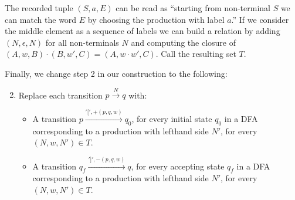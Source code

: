 \documentclass[runningheads]{llncs}
\newcommand{\pospl}{[}
\newcommand{\pospr}{]}
\begin{document}
The recorded tuple $(S, a, E)$ can be read as ``starting from non-terminal $S$ we can match the word $E$ by choosing the production with label $a$.'' If we consider the middle element as a sequence of labels we can build a relation by adding $(N, \epsilon, N)$ for all non-terminals $N$ and computing the closure of $(A, w, B) \cdot (B, w', C) = (A, w \cdot w', C)$. Call the resulting set $T$.

Finally, we change step 2 in our construction to the following:

\begin{enumerate}
  \setcounter{enumi}{1}
\item Replace each transition $p \xrightarrow{N} q$ with:
  \begin{itemize}
  \item A transition $p \xrightarrow{'\pospl', +(p,q,w)} q_0$, for every initial state $q_0$ in a DFA corresponding to a production with lefthand side $N'$, for every $(N, w, N') \in T$.
  \item A transition $q_f \xrightarrow{'\pospr', -(p,q,w)} q$, for every accepting state $q_f$ in a DFA corresponding to a production with lefthand side $N'$, for every $(N, w, N') \in T$.
  \end{itemize}
\end{enumerate}
\end{document}
